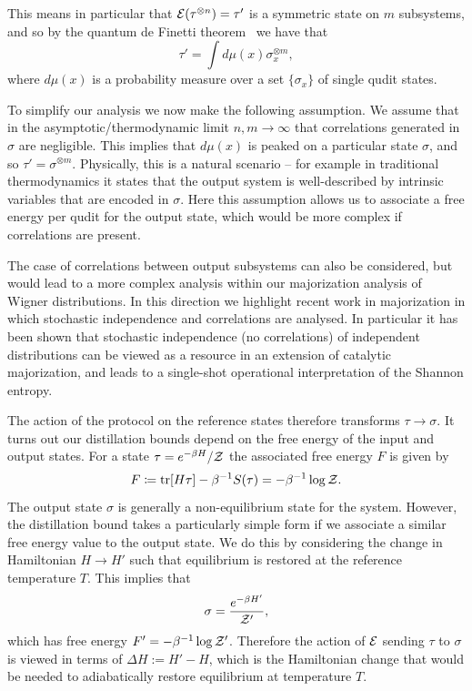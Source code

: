 \documentclass[pra,
aps,
twocolumn,
superscriptaddress,
groupedaddress,
nofootinbib,
reprint
]{revtex4-1}
\begin{document}
This means in particular that $\mathcal{E}(\tau^{\otimes n}) = \tau'$ is a symmetric state on $m$ subsystems, and so by the quantum de Finetti theorem~\cite{christandl_2007} we have that
\begin{equation}
\tau'  = \int d\mu(x) \sigma_x^{\otimes m},
\end{equation}
where $d\mu(x)$ is a probability measure over a set $\{\sigma_x\}$ of single qudit states.

To simplify our analysis we now make the following assumption. We assume that in the asymptotic/thermodynamic limit $n,m \rightarrow \infty$ that correlations generated in $\sigma$ are negligible. This implies that $d\mu(x)$ is peaked on a particular state $\sigma$, and so $\tau' = \sigma^{\otimes m}$. Physically, this is a natural scenario -- for example in traditional thermodynamics it states that the output system is well-described by intrinsic variables that are encoded in $\sigma$. Here this assumption allows us to associate a free energy per qudit for the output state, which would be more complex if correlations are present.

The case of correlations between output subsystems can also be considered, but would lead to a more complex analysis within our majorization analysis of Wigner distributions. In this direction we highlight recent work in majorization in which stochastic independence and correlations are analysed. In particular it has been shown that stochastic independence (no correlations) of independent distributions can be viewed as a resource in an extension of catalytic majorization, and leads to a single-shot operational interpretation of the Shannon entropy.

The action of the protocol on the reference states therefore transforms $\tau \rightarrow \sigma$. It turns out our distillation bounds depend on the free energy of the input and output states. For a state $\tau = e^{-\beta H}/\mathcal{Z}$ the associated free energy $F$ is given by
\begin{equation}
	F \coloneqq {\rm{tr}}[H \tau] - \beta^{-1}S(\tau) = -\beta^{-1}\log{\mathcal{Z}}.
\end{equation}
The output state $\sigma$ is generally a non-equilibrium state for the system. However, the distillation bound takes a particularly simple form if we associate a similar free energy value to the output state. We do this by considering the change in Hamiltonian $H \rightarrow H'$ such that equilibrium is restored at the reference temperature $T$. This implies that 
\begin{equation}
\sigma = \frac{e^{-\beta H'}}{\mathcal{Z}'},
\end{equation}
which has free energy $F' = -\beta^{-1} \log \mathcal{Z}'$. Therefore the action of $\mathcal{E}$ sending $\tau$ to $\sigma$ is viewed in terms of $\Delta H := H'-H$, which is the Hamiltonian change that would be needed to adiabatically restore equilibrium at temperature $T$. 
\end{document}
